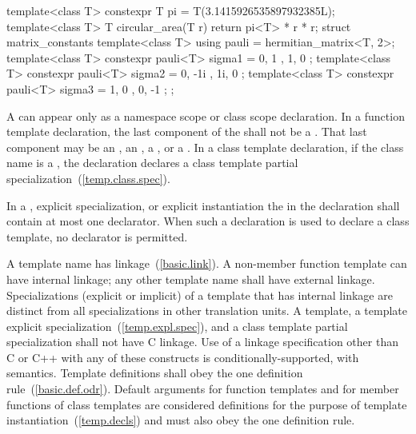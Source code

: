 \enterexample
\begin{codeblock}
template<class T>
  constexpr T pi = T(3.1415926535897932385L);
template<class T>
T circular_area(T r) {
  return pi<T> * r * r;
}
struct matrix_constants {
  template<class T>
   using pauli = hermitian_matrix<T, 2>;
  template<class T>
   constexpr pauli<T> sigma1 = { { 0, 1 }, { 1, 0 } };
  template<class T>
   constexpr pauli<T> sigma2 = { { 0, -1i }, { 1i, 0 } };
  template<class T>
   constexpr pauli<T> sigma3 = { { 1, 0 }, { 0, -1 } };
};
\end{codeblock}
\exitexample

\pnum
A
can appear only as a namespace scope or class scope declaration.
In a function template declaration, the last component of the
shall not be a
.
\enternote
That last component may be an , an ,
a , or a . In
a class template declaration, if the
class name
is a
,
the declaration declares a class template partial specialization~(\ref{temp.class.spec}).
\exitnote

\pnum
In a
,
explicit specialization, or explicit instantiation the
in the declaration shall contain at most one declarator.
When such a declaration is used to declare a class template,
no declarator is permitted.

\pnum
{}%
A template name has linkage~(\ref{basic.link}).
A non-member
function template can have internal linkage; any other
template name shall have external linkage.
Specializations (explicit or implicit) of
a template that has internal linkage are
distinct from all specializations in other translation
units.
A template, a template explicit specialization~(\ref{temp.expl.spec}), and a class
template partial specialization shall not have C linkage. Use of a linkage specification
other than C or C++ with any of these constructs is conditionally-supported, with
 semantics.
Template definitions shall obey the one definition rule~(\ref{basic.def.odr}).
\enternote
Default arguments for function templates and for member functions of
class templates are considered definitions for the purpose of template
instantiation~(\ref{temp.decls}) and must also obey the one definition rule.
\exitnote


